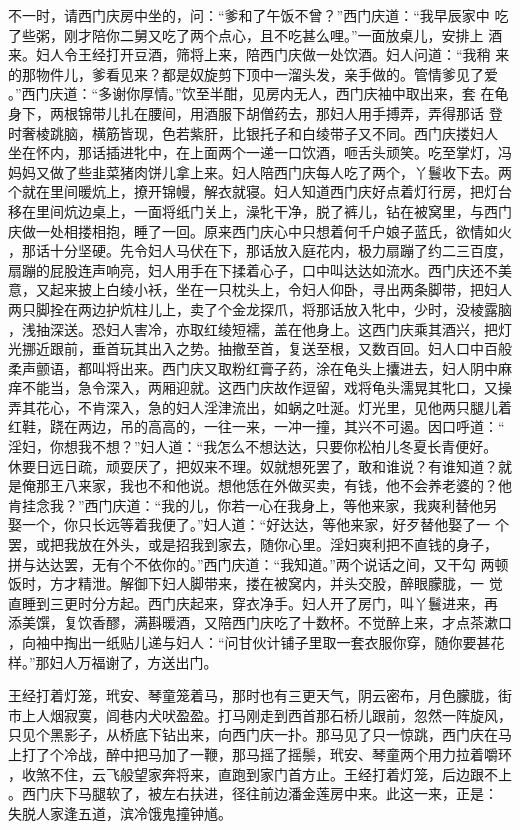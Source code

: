 不一时，请西门庆房中坐的，问：“爹和了午饭不曾？”西门庆道：“我早辰家中
吃了些粥，刚才陪你二舅又吃了两个点心，且不吃甚么哩。”一面放桌儿，安排上
酒来。妇人令王经打开豆酒，筛将上来，陪西门庆做一处饮酒。妇人问道：“我稍
来的那物件儿，爹看见来？都是奴旋剪下顶中一溜头发，亲手做的。管情爹见了爱
。”西门庆道：“多谢你厚情。”饮至半酣，见房内无人，西门庆袖中取出来，套
在龟身下，两根锦带儿扎在腰间，用酒服下胡僧药去，那妇人用手搏弄，弄得那话
登时奢棱跳脑，横筋皆现，色若紫肝，比银托子和白绫带子又不同。西门庆搂妇人
坐在怀内，那话插进牝中，在上面两个一递一口饮酒，咂舌头顽笑。吃至掌灯，冯
妈妈又做了些韭菜猪肉饼儿拿上来。妇人陪西门庆每人吃了两个，丫鬟收下去。两
个就在里间暖炕上，撩开锦幔，解衣就寝。妇人知道西门庆好点着灯行房，把灯台
移在里间炕边桌上，一面将纸门关上，澡牝干净，脱了裤儿，钻在被窝里，与西门
庆做一处相搂相抱，睡了一回。原来西门庆心中只想着何千户娘子蓝氏，欲情如火
，那话十分坚硬。先令妇人马伏在下，那话放入庭花内，极力扇蹦了约二三百度，
扇蹦的屁股连声响亮，妇人用手在下揉着心子，口中叫达达如流水。西门庆还不美
意，又起来披上白绫小袄，坐在一只枕头上，令妇人仰卧，寻出两条脚带，把妇人
两只脚拴在两边护炕柱儿上，卖了个金龙探爪，将那话放入牝中，少时，没棱露脑
，浅抽深送。恐妇人害冷，亦取红绫短襦，盖在他身上。这西门庆乘其酒兴，把灯
光挪近跟前，垂首玩其出入之势。抽撤至首，复送至根，又数百回。妇人口中百般
柔声颤语，都叫将出来。西门庆又取粉红膏子药，涂在龟头上攮进去，妇人阴中麻
痒不能当，急令深入，两厢迎就。这西门庆故作逗留，戏将龟头濡晃其牝口，又操
弄其花心，不肯深入，急的妇人淫津流出，如蜗之吐涎。灯光里，见他两只腿儿着
红鞋，跷在两边，吊的高高的，一往一来，一冲一撞，其兴不可遏。因口呼道：“
淫妇，你想我不想？”妇人道：“我怎么不想达达，只要你松柏儿冬夏长青便好。
休要日远日疏，顽耍厌了，把奴来不理。奴就想死罢了，敢和谁说？有谁知道？就
是俺那王八来家，我也不和他说。想他恁在外做买卖，有钱，他不会养老婆的？他
肯挂念我？”西门庆道：“我的儿，你若一心在我身上，等他来家，我爽利替他另
娶一个，你只长远等着我便了。”妇人道：“好达达，等他来家，好歹替他娶了一
个罢，或把我放在外头，或是招我到家去，随你心里。淫妇爽利把不直钱的身子，
拼与达达罢，无有个不依你的。”西门庆道：“我知道。”两个说话之间，又干勾
两顿饭时，方才精泄。解御下妇人脚带来，搂在被窝内，并头交股，醉眼朦胧，一
觉直睡到三更时分方起。西门庆起来，穿衣净手。妇人开了房门，叫丫鬟进来，再
添美馔，复饮香醪，满斟暖酒，又陪西门庆吃了十数杯。不觉醉上来，才点茶漱口
，向袖中掏出一纸贴儿递与妇人：“问甘伙计铺子里取一套衣服你穿，随你要甚花
样。”那妇人万福谢了，方送出门。

王经打着灯笼，玳安、琴童笼着马，那时也有三更天气，阴云密布，月色朦胧，街
市上人烟寂寞，闾巷内犬吠盈盈。打马刚走到西首那石桥儿跟前，忽然一阵旋风，
只见个黑影子，从桥底下钻出来，向西门庆一扑。那马见了只一惊跳，西门庆在马
上打了个冷战，醉中把马加了一鞭，那马摇了摇鬃，玳安、琴童两个用力拉着嚼环
，收煞不住，云飞般望家奔将来，直跑到家门首方止。王经打着灯笼，后边跟不上
。西门庆下马腿软了，被左右扶进，径往前边潘金莲房中来。此这一来，正是：
失脱人家逢五道，滨冷饿鬼撞钟馗。

